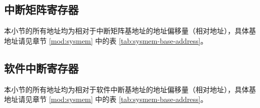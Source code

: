 \documentclass[main\_\_CN.tex]{subfiles}
\begin{document}
\subsection{中断矩阵寄存器}



本小节的所有地址均为相对于中断矩阵基地址的地址偏移量（相对地址），具体基地址请见章节 \ref{mod:sysmem} \textit{} 中的表 \ref{tab:sysmem-base-address}。


\subsection{软件中断寄存器}
\label{sec:intpri-reg}

本小节的所有地址均为相对于软件中断基地址的地址偏移量（相对地址），具体基地址请见章节 \ref{mod:sysmem} \textit{} 中的表 \ref{tab:sysmem-base-address}。


\end{document}
